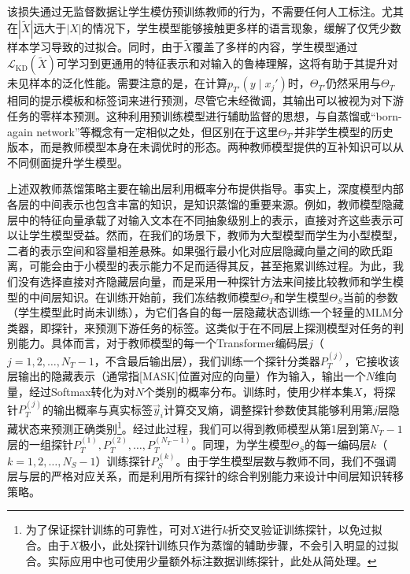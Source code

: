 \documentclass[../main.tex]{subfiles}
\begin{document}
该损失通过无监督数据让学生模仿预训练教师的行为，不需要任何人工标注。尤其在$|\tilde{X}|$远大于$|X|$的情况下，学生模型能够接触更多样的语言现象，缓解了仅凭少数样本学习导致的过拟合。同时，由于$\tilde{X}$覆盖了多样的内容，学生模型通过$\mathcal{L}_{\text{KD}}(\tilde{X})$可学习到更通用的特征表示和对输入的鲁棒理解，这将有助于其提升对未见样本的泛化性能。需要注意的是，在计算$p_{T'}(y \mid x_j')$时，$\Theta_{T'}$仍然采用与$\Theta_T$相同的提示模板和标签词来进行预测，尽管它未经微调，其输出可以被视为对下游任务的零样本预测。这种利用预训练模型进行辅助监督的思想，与自蒸馏或“born-again network”等概念有一定相似之处，但区别在于这里$\Theta_{T'}$并非学生模型的历史版本，而是教师模型本身在未调优时的形态。两种教师模型提供的互补知识可以从不同侧面提升学生模型。

\label{sec:ch3-3-2-contrastive-middle-layer-transfer}
上述双教师蒸馏策略主要在输出层利用概率分布提供指导。事实上，深度模型内部各层的中间表示也包含丰富的知识，是知识蒸馏的重要来源。例如，教师模型隐藏层中的特征向量承载了对输入文本在不同抽象级别上的表示，直接对齐这些表示可以让学生模型受益。然而，在我们的场景下，教师为大型模型而学生为小型模型，二者的表示空间和容量相差悬殊。如果强行最小化对应层隐藏向量之间的欧氏距离，可能会由于小模型的表示能力不足而适得其反，甚至拖累训练过程。为此，我们没有选择直接对齐隐藏层向量，而是采用一种探针方法来间接比较教师和学生模型的中间层知识。在训练开始前，我们冻结教师模型$\Theta_T$和学生模型$\Theta_S$当前的参数（学生模型此时尚未训练），为它们各自的每一层隐藏状态训练一个轻量的MLM分类器，即探针，来预测下游任务的标签。这类似于在不同层上探测模型对任务的判别能力。具体而言，对于教师模型的每一个Transformer编码层$j$（$j=1,2,\dots,N_T-1$，不含最后输出层），我们训练一个探针分类器$P_T^{(j)}$，它接收该层输出的隐藏表示（通常指[MASK]位置对应的向量）作为输入，输出一个$N$维向量，经过Softmax转化为对$N$个类别的概率分布。训练时，使用少样本集$X$，将探针$P_T^{(j)}$的输出概率与真实标签$\vec{y}_i$计算交叉熵，调整探针参数使其能够利用第$j$层隐藏状态来预测正确类别\footnote{为了保证探针训练的可靠性，可对$X$进行$k$折交叉验证训练探针，以免过拟合。由于$X$极小，此处探针训练只作为蒸馏的辅助步骤，不会引入明显的过拟合。实际应用中也可使用少量额外标注数据训练探针，此处从简处理。}。经过此过程，我们可以得到教师模型从第1层到第$N_T-1$层的一组探针${P_T^{(1)}, P_T^{(2)}, \dots, P_T^{(N_T-1)}}$。同理，为学生模型$\Theta_S$的每一编码层$k$（$k=1,2,\dots,N_S-1$）训练探针$P_S^{(k)}$。由于学生模型层数与教师不同，我们不强调层与层的严格对应关系，而是利用所有探针的综合判别能力来设计中间层知识转移策略。
\end{document}
